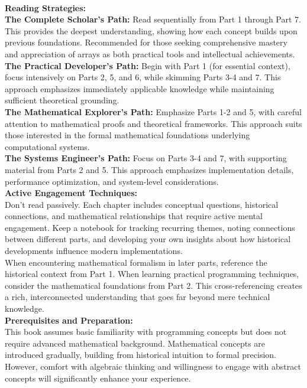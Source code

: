 \documentclass[12pt, oneside, openany]{book}
\begin{document}
\\
\textbf{Reading Strategies:}\\
\textbf{The Complete Scholar's Path:} Read sequentially from Part 1 through Part 7. This provides the deepest understanding, showing how each concept builds upon previous foundations. Recommended for those seeking comprehensive mastery and appreciation of arrays as both practical tools and intellectual achievements.\\
\textbf{The Practical Developer's Path:} Begin with Part 1 (for essential context), focus intensively on Parts 2, 5, and 6, while skimming Parts 3-4 and 7. This approach emphasizes immediately applicable knowledge while maintaining sufficient theoretical grounding.\\
\textbf{The Mathematical Explorer's Path:} Emphasize Parts 1-2 and 5, with careful attention to mathematical proofs and theoretical frameworks. This approach suits those interested in the formal mathematical foundations underlying computational systems.\\
\textbf{The Systems Engineer's Path:} Focus on Parts 3-4 and 7, with supporting material from Parts 2 and 5. This approach emphasizes implementation details, performance optimization, and system-level considerations.\\
\textbf{Active Engagement Techniques:}\\
Don't read passively. Each chapter includes conceptual questions, historical connections, and mathematical relationships that require active mental engagement. Keep a notebook for tracking recurring themes, noting connections between different parts, and developing your own insights about how historical developments influence modern implementations.\\
When encountering mathematical formalism in later parts, reference the historical context from Part 1. When learning practical programming techniques, consider the mathematical foundations from Part 2. This cross-referencing creates a rich, interconnected understanding that goes far beyond mere technical knowledge.\\
\textbf{Prerequisites and Preparation:}\\
This book assumes basic familiarity with programming concepts but does not require advanced mathematical background. Mathematical concepts are introduced gradually, building from historical intuition to formal precision. However, comfort with algebraic thinking and willingness to engage with abstract concepts will significantly enhance your experience.\\
\end{document}
